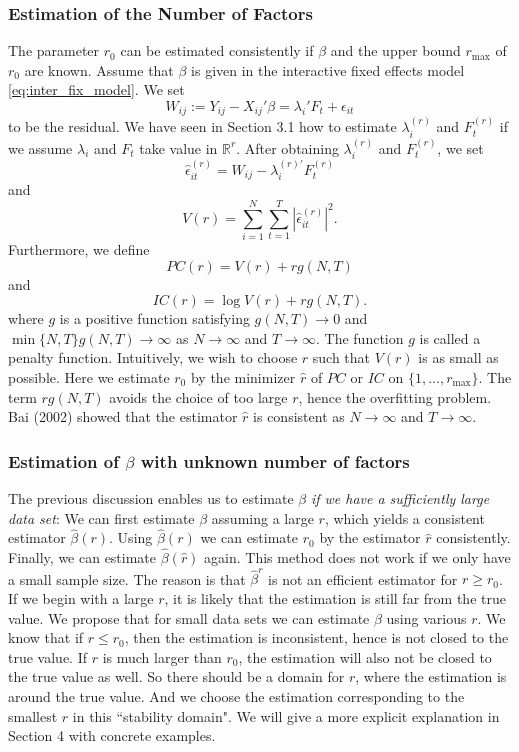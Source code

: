 \documentclass[a4paper]{article}
\newcommand{\IR}[0]{\mathbb{R}}
\begin{document}
\subsubsection{Estimation of the Number of Factors}
The parameter $r_0$ can be estimated consistently if $\beta$ and the upper bound $r_{\text{max}}$ of $r_{0}$ are known. Assume that $\beta$ is given in the interactive fixed effects model \eqref{eq:inter_fix_model}. We set $$W_{ij}:=Y_{ij}-X_{ij}'\beta=\lambda_i'F_t+\epsilon_{it}$$ to be the residual. We have seen in Section 3.1 how to estimate $\lambda_i^{(r)}$ and $F_t^{(r)}$ if we assume $\lambda_i$ and $F_t$ take value in $\IR^r$. After obtaining $\lambda_i^{(r)}$ and $F_t^{(r)}$, we set
\[
	\hat \epsilon_{it}^{(r)}=W_{ij}-\lambda_i^{(r)\prime}F_t^{(r)}
\]
and
\[
	V(r)=\sum_{i=1}^{N}\sum_{t=1}^{T}|\hat \epsilon_{it}^{(r)}|^2.
\]
Furthermore, we define
\[
    PC(r)=V(r)+rg(N,T)
\]
and
\[
    IC(r)=\log V(r)+rg(N,T).
\]
where $g$ is a positive function satisfying $g(N,T)\to 0$ and $\min\{N,T\}g(N,T)\to \infty$ as $N \to \infty$ and $T \to \infty$. The function $g$ is called a penalty function. Intuitively, we wish to choose $r$ such that $V(r)$ is as small as possible. Here we estimate $r_0$ by the minimizer $\hat r$ of $PC$ or $IC$ on $\{1,\ldots, r_{\text{max}}\}$. The term $rg(N,T)$ avoids the choice of too large $r$, hence the overfitting problem. Bai (2002) showed that the estimator $\hat r$ is consistent as $N \to \infty$ and $T \to \infty$.


\subsubsection{Estimation of \texorpdfstring{$\beta$}{Lg} with unknown number of factors}
The previous discussion enables us to estimate $\beta$ \textit{if we have a sufficiently large data set}: We can first estimate $\beta$ assuming a large $r$, which yields a consistent estimator $\hat \beta(r)$. Using $\hat \beta (r)$ we can estimate $r_0$ by the estimator $\hat r$ consistently. Finally, we can estimate $\hat\beta(\hat r)$ again. This method does not work if we only have a small sample size. The reason is that $\hat \beta^r$ is not an efficient estimator for $r\geq r_0$. If we begin with a large $r$, it is likely that the estimation is still far from the true value. We propose that for small data sets we can estimate $\beta$ using various $r$. We know that if $r\leq r_0$, then the estimation is inconsistent, hence is not closed to the true value. If $r$ is much larger than $r_0$, the estimation will also not be closed to the true value as well. So there should be a domain for $r$, where the estimation is around the true value. And we choose the estimation corresponding to the smallest $r$ in this ``stability domain". We will give a more explicit explanation in Section 4 with concrete examples.
\end{document}
